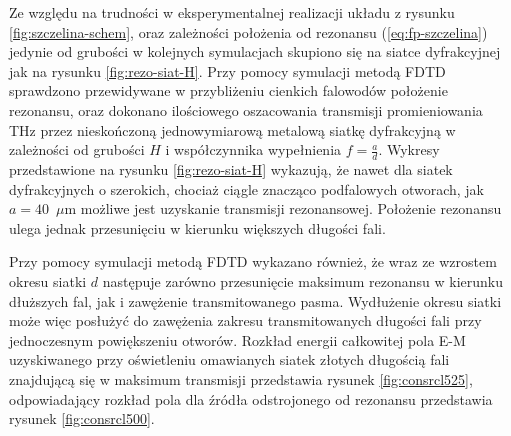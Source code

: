 Ze względu na trudności w eksperymentalnej realizacji układu z rysunku \ref{fig:szczelina-schem}, oraz zależności położenia od rezonansu (\ref{eq:fp-szczelina}) jedynie od grubości w kolejnych symulacjach skupiono się na siatce dyfrakcyjnej jak na rysunku \ref{fig:rezo-siat-H}.  Przy pomocy symulacji metodą FDTD sprawdzono przewidywane w przybliżeniu cienkich falowodów położenie rezonansu, oraz dokonano ilościowego oszacowania transmisji promieniowania THz przez nieskończoną jednowymiarową metalową siatkę dyfrakcyjną w zależności od grubości $H$ i współczynnika wypełnienia $f=\frac{a}{d}$. Wykresy przedstawione na rysunku \ref{fig:rezo-siat-H} wykazują, że nawet dla siatek dyfrakcyjnych o szerokich, chociaż ciągle znacząco podfalowych otworach, jak $a=40$~$\mu$m możliwe jest uzyskanie transmisji rezonansowej. Położenie rezonansu ulega jednak przesunięciu w kierunku większych długości fali. \cite{Szczytko2012271} 

Przy pomocy symulacji metodą FDTD wykazano również, że wraz ze wzrostem okresu siatki $d$ następuje zarówno przesunięcie maksimum rezonansu w kierunku dłuższych fal, jak i zawężenie transmitowanego pasma. Wydłużenie okresu siatki może więc posłużyć do zawężenia zakresu transmitowanych długości fali przy jednoczesnym powiększeniu otworów. Rozkład energii całkowitej pola E-M uzyskiwanego przy oświetleniu omawianych siatek złotych długością fali znajdującą się w maksimum transmisji przedstawia rysunek \ref{fig:consrcl525}, odpowiadający rozkład pola dla źródła odstrojonego od rezonansu przedstawia rysunek \ref{fig:consrcl500}.

